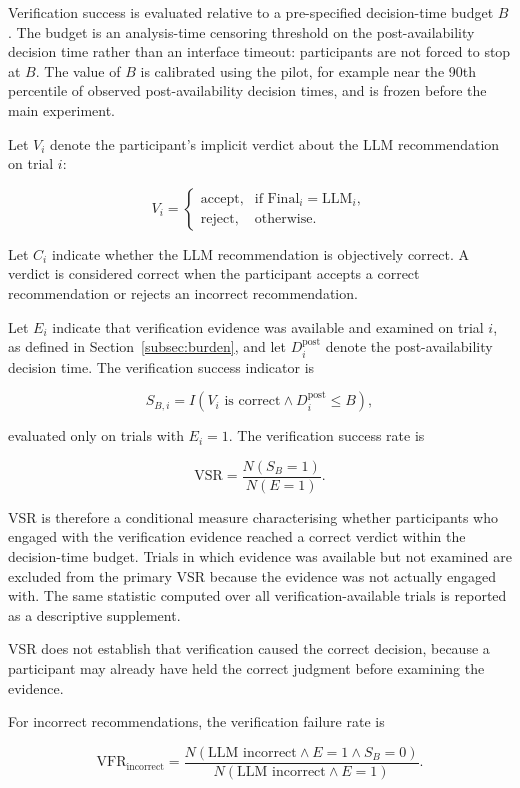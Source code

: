 \documentclass[oneside,final,14pt,a4paper]{extreport}
\begin{document}
Verification success is evaluated relative to a pre-specified decision-time
budget $B$. The budget is an analysis-time censoring threshold on the
post-availability decision time rather than an interface timeout: participants
are not forced to stop at $B$. The value of $B$ is calibrated using the pilot,
for example near the 90th percentile of observed post-availability decision
times, and is frozen before the main experiment.

Let $V_i$ denote the participant's implicit verdict about the LLM
recommendation on trial $i$:

$$
V_i =
\begin{cases}
\text{accept}, & \text{if Final}_i=\text{LLM}_i,\\
\text{reject}, & \text{otherwise}.
\end{cases}
$$

Let $C_i$ indicate whether the LLM recommendation is objectively correct. A
verdict is considered correct when the participant accepts a correct
recommendation or rejects an incorrect recommendation.

Let $E_i$ indicate that verification evidence was available and examined on
trial $i$, as defined in Section~\ref{subsec:burden}, and let
$D_i^{\mathrm{post}}$ denote the post-availability decision time. The
verification success indicator is

$$
S_{B,i}
=
I\left(
V_i\text{ is correct}
\land
D_i^{\mathrm{post}}\leq B
\right),
$$

evaluated only on trials with $E_i=1$. The verification success rate is

$$
\text{VSR}
=
\frac{
N(S_B=1)
}{
N(E=1)
}.
$$

VSR is therefore a conditional measure characterising whether participants
who engaged with the verification evidence reached a correct verdict within
the decision-time budget. Trials in which evidence was available but not
examined are excluded from the primary VSR because the evidence was not
actually engaged with. The same statistic computed over all
verification-available trials is reported as a descriptive supplement.

VSR does not establish that verification caused the correct decision, because
a participant may already have held the correct judgment before examining the
evidence.

For incorrect recommendations, the verification failure rate is

$$
\text{VFR}_{\mathrm{incorrect}}
=
\frac{
N(\text{LLM incorrect}\land E=1\land S_B=0)
}{
N(\text{LLM incorrect}\land E=1)
}.
$$
\end{document}
